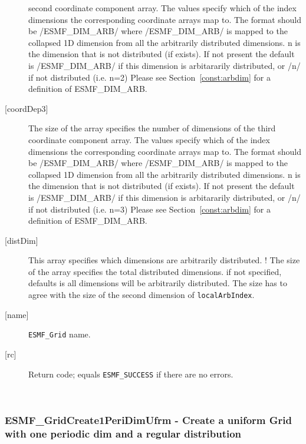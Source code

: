 \begin{description}
       second coordinate component array. The values specify which
       of the index dimensions the corresponding coordinate
       arrays map to. The format should be /ESMF\_DIM\_ARB/ where
       /ESMF\_DIM\_ARB/ is mapped to the collapsed 1D dimension from all
       the arbitrarily distributed dimensions.  n is the dimension that
       is not distributed (if exists).
       If not present the default is /ESMF\_DIM\_ARB/ if this dimension
       is arbitararily distributed, or /n/ if not distributed (i.e. n=2)
       Please see Section~\ref{const:arbdim} for a definition of ESMF\_DIM\_ARB.
   \item[{[coordDep3]}]
       The size of the array specifies the number of dimensions of the
       third coordinate component array. The values specify which
       of the index dimensions the corresponding coordinate
       arrays map to. The format should be /ESMF\_DIM\_ARB/ where
       /ESMF\_DIM\_ARB/ is mapped to the collapsed 1D dimension from all
       the arbitrarily distributed dimensions.  n is the dimension that
       is not distributed (if exists).
       If not present the default is /ESMF\_DIM\_ARB/ if this dimension
       is arbitararily distributed, or /n/ if not distributed (i.e. n=3)
       Please see Section~\ref{const:arbdim} for a definition of ESMF\_DIM\_ARB.
   \item[{[distDim]}]
         This array specifies which dimensions are arbitrarily distributed.
   !       The size of the array specifies the total distributed dimensions.
         if not specified, defaults is all dimensions will be arbitrarily
         distributed.  The size has to agree with the size of the second
         dimension of {\tt localArbIndex}.
   \item[{[name]}]
            {\tt ESMF\_Grid} name.
   \item[{[rc]}]
        Return code; equals {\tt ESMF\_SUCCESS} if there are no errors.
   \end{description}
   
 
\mbox{}\hrulefill\ 
 
\subsubsection [ESMF\_GridCreate1PeriDimUfrm] {ESMF\_GridCreate1PeriDimUfrm - Create a uniform Grid with one periodic dim and a regular distribution}


